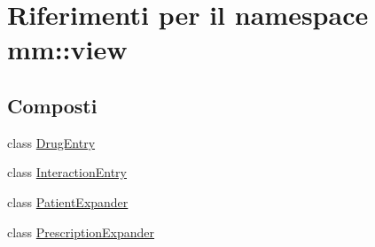 \hypertarget{namespacemm_1_1view}{}\section{Riferimenti per il namespace mm\+:\+:view}
\label{namespacemm_1_1view}
\subsection*{Composti}
\begin{DoxyCompactItemize}
\item 
class \mbox{\hyperlink{classmm_1_1view_1_1_drug_entry}{Drug\+Entry}}
\item 
class \mbox{\hyperlink{classmm_1_1view_1_1_interaction_entry}{Interaction\+Entry}}
\item 
class \mbox{\hyperlink{classmm_1_1view_1_1_patient_expander}{Patient\+Expander}}
\item 
class \mbox{\hyperlink{classmm_1_1view_1_1_prescription_expander}{Prescription\+Expander}}
\end{DoxyCompactItemize}
